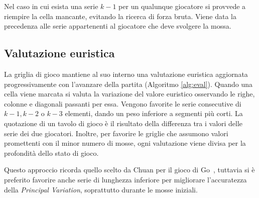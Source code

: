 \documentclass{article}
\begin{document}
Nel caso in cui esista una serie $k-1$ per un qualunque giocatore si provvede a
riempire la cella mancante, evitando la ricerca di forza bruta. Viene data la
precedenza alle serie appartenenti al giocatore che deve svolgere la mossa.

\subsection*{Valutazione euristica}

La griglia di gioco mantiene al suo interno una valutazione euristica 
aggiornata progressivamente con l'avanzare della partita (Algoritmo \vref{alg:eval}).
Quando una cella viene marcata si valuta la variazione del valore euristico osservando
le righe, colonne e diagonali passanti per essa. Vengono favorite le serie consecutive 
di $k-1, k-2$ o $k-3$ elementi, dando un peso inferiore a segmenti pi\`u corti.
La quotazione di un tavolo di gioco \`e il risultato della differenza tra i
valori delle serie dei due giocatori. Inoltre, per favorire le griglie che
assumono valori promettenti con il minor numero di mosse, ogni
valutazione viene divisa per la profondit\`a dello stato di gioco.

Questo approccio ricorda quello scelto da Chuan per il gioco di Go~\cite{chuan}, %
tuttavia si \`e preferito favorire anche serie di lunghezza inferiore per migliorare 
l'accuratezza della \emph{Principal Variation}, soprattutto durante le mosse iniziali.
\end{document}
